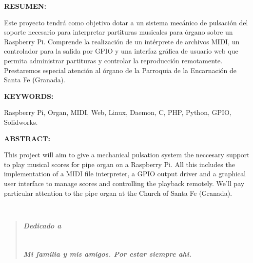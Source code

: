 \begin{doublespace}
\noindent \textbf{RESUMEN:}
\end{doublespace}

\begin{singlespace}

\noindent Este proyecto tendrá como objetivo dotar a un sistema mecánico de pulsación del soporte necesario para interpretar partituras musicales para órgano sobre un Raspberry Pi. Comprende la realización de un intérprete de archivos MIDI, un controlador para la salida por GPIO y una interfaz gráfica de usuario web que permita administrar partituras y controlar la reproducción remotamente. Prestaremos especial atención al órgano de la Parroquia de la Encarnación de Santa Fe (Granada).
\end{singlespace}

\vspace{1.25cm}

\begin{doublespace}
\noindent \textbf{KEYWORDS:}
\end{doublespace}

\begin{singlespace}
\noindent Raspberry Pi, Organ, MIDI, Web, Linux, Daemon, C, PHP, Python, GPIO, Solidworks.
\end{singlespace}

\begin{doublespace}
\noindent \textbf{ABSTRACT:}
\end{doublespace}

\begin{singlespace}
\noindent This project will aim to give a mechanical pulsation system the neccesary support to play musical scores for pipe organ on a Raspberry Pi. All this includes the implementation of a MIDI file interpreter, a GPIO output driver and a graphical user interface to manage scores and controlling the playback remotely. We'll pay particular attention to the pipe organ at the Church of Santa Fe (Granada).
\end{singlespace}

\newpage
\thispagestyle{empty}

~

\cleardoublepage
{}
\thispagestyle{empty}

\vspace{6cm}

\begin{quotation}
\noindent \begin{center}
\textbf{\emph{\Large Dedicado a}}\textbf{\emph{\large }}\\
\textbf{\emph{\large }}\\
\textbf{\emph{\large }}\\
\textbf{\emph{\large Mi familia y mis amigos. Por estar siempre ahí.}}
\par\end{center}{\large \par}
\end{quotation}
\newpage
\thispagestyle{empty}

~\newpage
\thispagestyle{empty}


